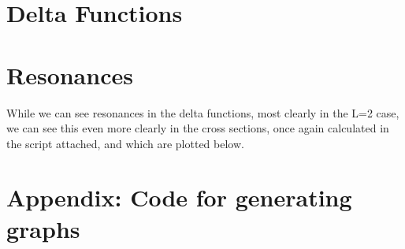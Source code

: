 \documentclass[11pt]{article} %
\begin{document}
\section{Delta Functions}

\section{Resonances}

While we can see resonances in the delta functions, most clearly in the L=2 case, we can see this even more clearly in the cross sections, once again calculated in the script attached, and which are plotted below.\\


\vspace{.1mm}
\begin{figure}[htbp]
\centering
\begin{floatrow}
\quad
{}
\quad
{}
\end{floatrow}
\end{figure}
\section{Appendix: Code for generating graphs}

\end{document}
